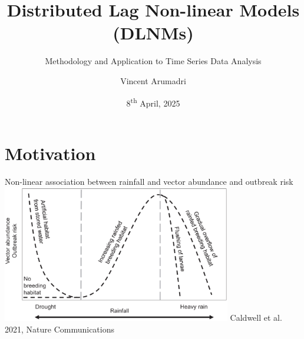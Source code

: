 \documentclass[english]{beamer}
\title{Distributed Lag Non-linear Models (DLNMs)}
\subtitle{Methodology and Application to Time Series Data Analysis }
\author{Vincent Arumadri}
\institute{Department of Public Health \\
\vspace{0.3cm} Erasmus MC}
\date{8\textsuperscript{th} April, 2025}
\begin{document}
\begin{frame}
    \titlepage
\end{frame}
\section{Motivation}
\begin{frame}{Non-linear association between rainfall and vector abundance and outbreak risk}
    \centering
    \includegraphics[width=10cm,keepaspectratio]{images/nonlinear_effect_outbreaks.png}
    \vspace{0.3cm}
    {\footnotesize Caldwell et al. 2021, Nature Communications}
\end{frame}
\end{document}
